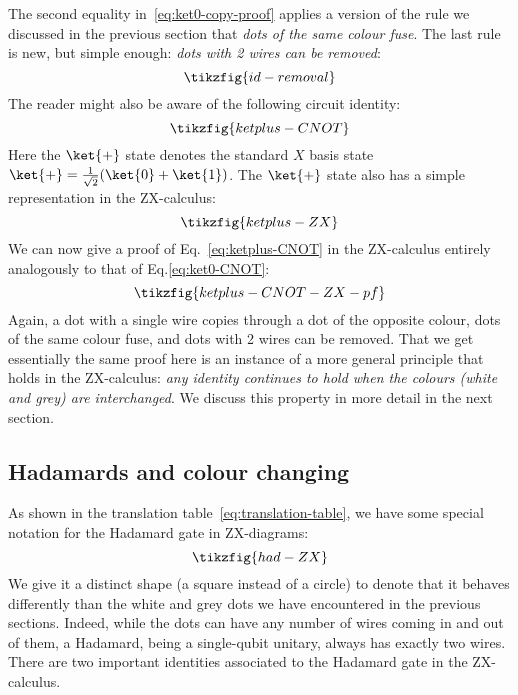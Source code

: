 \documentclass[a4paper,onecolumn,superscriptaddress,11pt,%
				unpublished,%
				allowfontchageintitle,%
				]{quantumarticle}
\begin{document}
The second equality in~\eqref{eq:ket0-copy-proof} applies a version of the rule we discussed in the previous section that \emph{dots of the same colour fuse}. The last rule is new, but simple enough: \emph{dots with 2 wires can be removed}:
\begin{equation}
\tikzfig{id-removal}
\end{equation}
The reader might also be aware of the following circuit identity:
\begin{equation}\label{eq:ketplus-CNOT}
\tikzfig{ketplus-CNOT}
\end{equation}
Here the $\ket{+}$ state denotes the standard $X$ basis state $\ket{+}=\frac{1}{\sqrt{2}}(\ket{0}+\ket{1})$.
The $\ket{+}$ state also has a simple representation in the ZX-calculus:
\begin{equation}\label{ketplus-ZX}
\tikzfig{ketplus-ZX}
\end{equation}
We can now give a proof of Eq.~\eqref{eq:ketplus-CNOT} in the ZX-calculus entirely analogously to that of Eq.\eqref{eq:ket0-CNOT}:
\begin{equation}
 \tikzfig{ketplus-CNOT-ZX-pf}
\end{equation}
Again, a dot with a single wire copies through a dot of the opposite colour, dots of the same colour fuse, and dots with 2 wires can be removed.
That we get essentially the same proof here is an instance of a more general principle that holds in the ZX-calculus: \emph{any identity continues to hold when the colours (white and grey) are interchanged}.
We discuss this property in more detail in the next section.


\subsection{Hadamards and colour changing}\label{sec:hadamard-colour}

As shown in the translation table~\eqref{eq:translation-table}, we have some special notation for the Hadamard gate in ZX-diagrams:
\begin{equation}
\tikzfig{had-ZX}
\end{equation}
We give it a distinct shape (a square instead of a circle) to denote that it behaves differently than the white and grey dots we have encountered in the previous sections. Indeed, while the dots can have any number of wires coming in and out of them, a Hadamard, being a single-qubit unitary, always has exactly two wires. There are two important identities associated to the Hadamard gate in the ZX-calculus.
\end{document}
